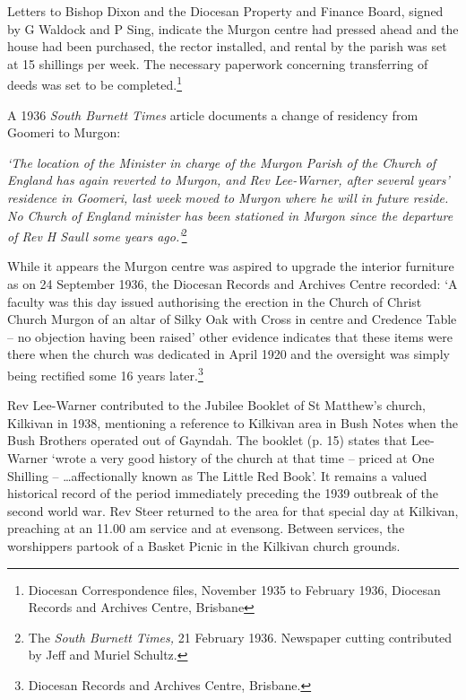 Letters to Bishop Dixon and the Diocesan Property and Finance Board, signed by G Waldock and P Sing, indicate the Murgon centre had pressed ahead and the house had been purchased, the rector installed, and rental by the parish was set at 15 shillings per week. The necessary paperwork concerning transferring of deeds was set to be completed.\footnote{Diocesan Correspondence files, November 1935 to February 1936, Diocesan Records and Archives Centre, Brisbane}


A 1936 \emph{South Burnett Times} article documents a change of residency from Goomeri to Murgon:



\emph{`The location of the Minister in charge of the Murgon Parish of the Church of England has again reverted to Murgon, and Rev Lee-Warner, after several years' residence in Goomeri, last week moved to Murgon where he will in future reside. No Church of England minister has been stationed in Murgon since the departure of Rev H Saull some years ago.'}\footnote{The \emph{South Burnett Times,} 21 February 1936. Newspaper cutting contributed by Jeff and Muriel Schultz.}


\smallskip


While it appears the Murgon centre was aspired to upgrade the interior furniture as on 24 September 1936, the Diocesan Records and Archives Centre recorded: `A faculty was this day issued authorising the erection in the Church of Christ Church Murgon of an altar of Silky Oak with Cross in centre and Credence Table -- no objection having been raised' other evidence indicates that these items were there when the church was dedicated in April 1920 and the oversight was simply being rectified some 16 years later.\footnote{Diocesan Records and Archives Centre, Brisbane.}


Rev Lee-Warner contributed to the Jubilee Booklet of St Matthew's church, Kilkivan in 1938, mentioning a reference to Kilkivan area in Bush Notes when the Bush Brothers operated out of Gayndah. The booklet (p. 15) states that Lee-Warner `wrote a very good history of the church at that time -- priced at One Shilling -- \ldots affectionally known as The Little Red Book'. It remains a valued historical record of the period immediately preceding the 1939 outbreak of the second world war. Rev Steer returned to the area for that special day at Kilkivan, preaching at an 11.00 am service and at evensong. Between services, the worshippers partook of a Basket Picnic in the Kilkivan church grounds.




